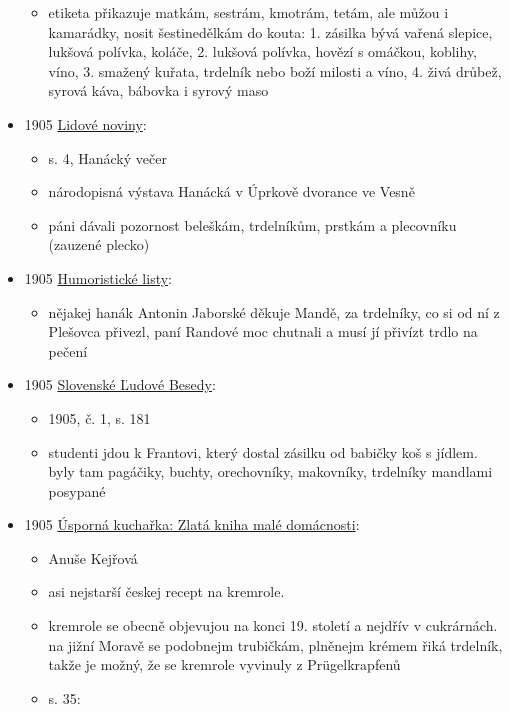 \begin{itemize}
  \begin{itemize}
  \tightlist
  \item
    etiketa přikazuje matkám, sestrám, kmotrám, tetám, ale můžou i
    kamarádky, nosit šestinedělkám do kouta: 1. zásilka bývá vařená
    slepice, lukšová polívka, koláče, 2. lukšová polívka, hovězí s
    omáčkou, koblihy, víno, 3. smažený kuřata, trdelník nebo boží
    milosti a víno, 4. živá drůbež, syrová káva, bábovka i syrový maso
  \end{itemize}
\item
  1905
  \href{https://ceskadigitalniknihovna.cz/uuid/uuid:b78503e3-435d-11dd-b505-00145e5790ea}{Lidové
  noviny}:

  \begin{itemize}
  \tightlist
  \item
    s. 4, Hanácký večer
  \item
    národopisná výstava Hanácká v Úprkově dvorance ve Vesně
  \item
    páni dávali pozornost beleškám, trdelníkům, prstkám a plecovníku
    (zauzené plecko)
  \end{itemize}
\item
  1905
  \href{https://ceskadigitalniknihovna.cz/uuid/uuid:e6cc2207-435d-11dd-b505-00145e5790ea}{Humoristické
  listy}:

  \begin{itemize}
  \tightlist
  \item
    nějakej hanák Antonin Jaborské děkuje Mandě, za trdelníky, co si od
    ní z Plešovca přivezl, paní Randové moc chutnali a musí jí přivízt
    trdlo na pečení
  \end{itemize}
\item
  1905
  \href{https://dikda.snk.sk/uuid/uuid:f4689941-92c2-4efa-b830-9c02c5e1dbf7}{Slovenské
  Ľudové Besedy}:

  \begin{itemize}
  \tightlist
  \item
    1905, č. 1, s. 181
  \item
    studenti jdou k Frantovi, který dostal zásilku od babičky koš s
    jídlem. byly tam pagáčiky, buchty, orechovníky, makovníky, trdelníky
    mandlami posypané
  \end{itemize}
\item
  1905
  \href{https://ceskadigitalniknihovna.cz/uuid/uuid:92266300-0c11-11ed-9dda-5ef3fc9bb22f}{Úsporná
  kuchařka: Zlatá kniha malé domácnosti}:

  \begin{itemize}
  \tightlist
  \item
    Anuše Kejřová
  \item
    asi nejstarší českej recept na kremrole.
  \item
    kremrole se obecně objevujou na konci 19. století a nejdřív v
    cukrárnách. na jižní Moravě se podobnejm trubičkám, plněnejm krémem
    řiká trdelník, takže je možný, že se kremrole vyvinuly z
    Prügelkrapfenů
  \item
    s. 35:


\end{itemize}
\end{itemize}
